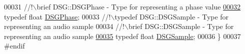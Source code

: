 \begin{DoxyCode}
00031 \textcolor{comment}{    //!\(\backslash\)brief DSG::DSGPhase - Type for representing a phase value}
\hypertarget{_d_s_g_types_8h_source_l00032}{}\hyperlink{namespace_d_s_g_a44431ce1eb0a7300efdd207bc879e52c}{00032} \textcolor{comment}{}    \textcolor{keyword}{typedef} \textcolor{keywordtype}{float} \hyperlink{namespace_d_s_g_a44431ce1eb0a7300efdd207bc879e52c}{DSGPhase};\textcolor{comment}{}
00033 \textcolor{comment}{    //!\(\backslash\)typedef DSG::DSGSample - Type for representing an audio sample}
00034 \textcolor{comment}{    //!\(\backslash\)brief DSG::DSGSample - Type for representing an audio sample}
\hypertarget{_d_s_g_types_8h_source_l00035}{}\hyperlink{namespace_d_s_g_ac39a94cd27ebcd9c1e7502d0c624894a}{00035} \textcolor{comment}{}    \textcolor{keyword}{typedef} \textcolor{keywordtype}{float} \hyperlink{namespace_d_s_g_ac39a94cd27ebcd9c1e7502d0c624894a}{DSGSample};
00036 \}
00037 \textcolor{preprocessor}{#endif}
\end{DoxyCode}
